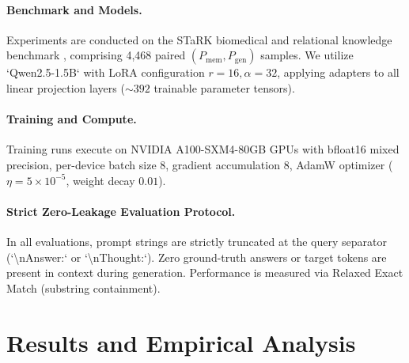 \documentclass[11pt]{article}
\newcommand{\Pmem}{P_{\text{mem}}}
\newcommand{\Pgen}{P_{\text{gen}}}
\theoremstyle{definition}
\begin{document}
\paragraph{Benchmark and Models.} Experiments are conducted on the STaRK biomedical and relational knowledge benchmark \cite{wu2024stark}, comprising 4,468 paired $(\Pmem, \Pgen)$ samples. We utilize `Qwen2.5-1.5B` \cite{qwen25} with LoRA configuration $r=16, \alpha=32$, applying adapters to all linear projection layers ($\sim 392$ trainable parameter tensors).

\paragraph{Training and Compute.} Training runs execute on NVIDIA A100-SXM4-80GB GPUs with bfloat16 mixed precision, per-device batch size 8, gradient accumulation 8, AdamW optimizer ($\eta = 5\times 10^{-5}$, weight decay $0.01$). 

\paragraph{Strict Zero-Leakage Evaluation Protocol.} In all evaluations, prompt strings are strictly truncated at the query separator (`\textbackslash nAnswer:` or `\textbackslash nThought:`). Zero ground-truth answers or target tokens are present in context during generation. Performance is measured via Relaxed Exact Match (substring containment).

\section{Results and Empirical Analysis}\label{sec:results}
\end{document}
